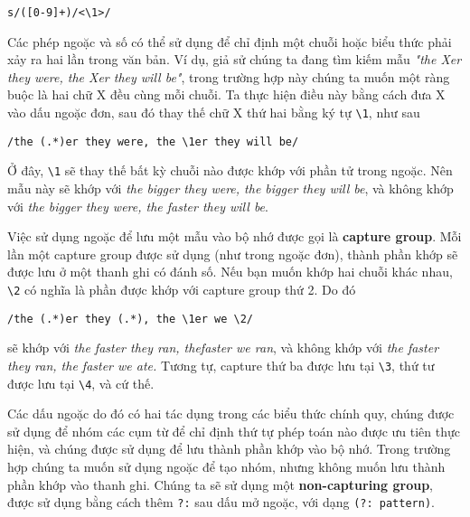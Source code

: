 \vspace{0.6em}

\noindent \verb|s/([0-9]+)/<\1>/|

\vspace{0.6em}

Các phép ngoặc và số có thể sử dụng để chỉ định một chuỗi hoặc biểu thức phải xảy ra hai lần trong văn bản. Ví dụ, giả sử chúng ta đang tìm kiếm mẫu \textit{"the Xer they were, the Xer they will be"}, trong trường hợp này chúng ta muốn một ràng buộc là hai chữ X đều cùng mỗi chuỗi. Ta thực hiện điều này bằng cách đưa X vào dấu ngoặc đơn, sau đó thay thế chữ X thứ hai bằng ký tự \verb|\1|, như sau

\vspace{0.6em}

\noindent \verb|/the (.*)er they were, the \1er they will be/|

\vspace{0.6em}

Ở đây, \verb|\1| sẽ thay thế bất kỳ chuỗi nào được khớp với phần tử trong ngoặc. Nên mẫu này sẽ khớp với \textit{the bigger they were, the bigger they will be}, và không khớp với \textit{the bigger they were, the faster they will be}.

Việc sử dụng ngoặc để lưu một mẫu vào bộ nhớ được gọi là \textbf{capture group}. Mỗi lần một capture group được sử dụng (như trong ngoặc đơn), thành phần khớp sẽ được lưu ở một thanh ghi có đánh số. Nếu bạn muốn khớp hai chuỗi khác nhau, \verb|\2| có nghĩa là phần được khớp với capture group thứ 2. Do đó

\vspace{0.6em}

\noindent \verb|/the (.*)er they (.*), the \1er we \2/|

\vspace{0.6em}

\noindent sẽ khớp với \textit{the faster they ran, thefaster we ran}, và không khớp với \textit{the faster they ran, the faster we ate.} Tương tự, capture thứ ba được lưu tại \verb|\3|, thứ tư được lưu tại \verb|\4|, và cứ thế.

Các dấu ngoặc do đó có hai tác dụng trong các biểu thức chính quy, chúng được sử dụng để nhóm các cụm từ để chỉ định thứ tự phép toán nào được ưu tiên thực hiện, và chúng được sử dụng để lưu thành phần khớp vào bộ nhớ. Trong trường hợp chúng ta muốn sử dụng ngoặc để tạo nhóm, nhưng không muốn lưu thành phần khớp vào thanh ghi. Chúng ta sẽ sử dụng một \textbf{non-capturing group}, được sử dụng bằng cách thêm \verb|?:| sau dấu mở ngoặc, với dạng \verb|(?: pattern)|.

